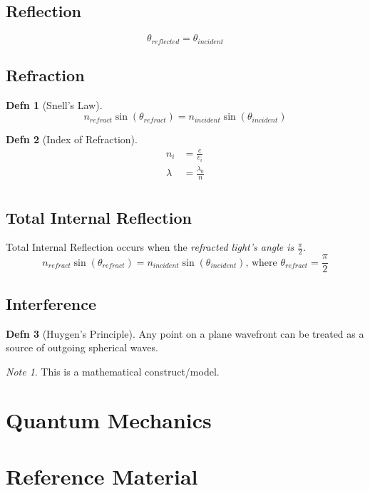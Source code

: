 \documentclass[10pt,letterpaper,final,twoside,notitlepage]{article}
\numberwithin{equation}{section} %
\theoremstyle{definition}
\newtheorem{definition}{Defn} %
\theoremstyle{remark}
\newtheorem{note}{Note}[definition] %
\begin{document}
	\subsection*{Reflection} \label{subsec:Reflection}
		\begin{equation} \label{eq:Reflected Light}
			\theta_{reflected} = \theta_{incident}
		\end{equation}
		
	\subsection*{Refraction} \label{subsec:Refraction}
		\begin{definition}[Snell's Law] \label{def:Snell's Law}
			\begin{equation} \label{eq:Refracted Light} 
				n_{refract} \sin \left( \theta_{refract} \right) = n_{incident} \sin \left( \theta_{incident} \right)
			\end{equation}
		\end{definition}
		\begin{definition}[Index of Refraction] \label{def:Index of Refraction}
			\begin{equation} \label{eq:Index of Refraction}
				\begin{aligned}
					n_{i} &= \frac{c}{v_{i}} \\
					\lambda &= \frac{\lambda_{0}}{n} \\
				\end{aligned}
			\end{equation}
		\end{definition}
	
	\subsection*{Total Internal Reflection} \label{subsec:Total Internal Reflection}
		Total Internal Reflection occurs when the \emph{refracted light's angle is $\frac{\pi}{2}$}.
		\begin{equation} \label{eq:Total Internal Reflection}
			n_{refract} \sin \left( \theta_{refract} \right) = n_{incident} \sin \left( \theta_{incident} \right) \text{, where } \theta_{refract} = \frac{\pi}{2}
		\end{equation}
		
	\subsection*{Interference} \label{subsec:Light Interference}
		\begin{definition}[Huygen's Principle] \label{def:Huygen's Principle}
			Any point on a plane wavefront can be treated as a source of outgoing spherical waves.
			\begin{note}
				This is a mathematical construct/model.
			\end{note}
		\end{definition}

\section{Quantum Mechanics} \label{sec:Quantum Mech}

\appendix
\section{Reference Material} \label{sec:Reference Material}



\end{document}
